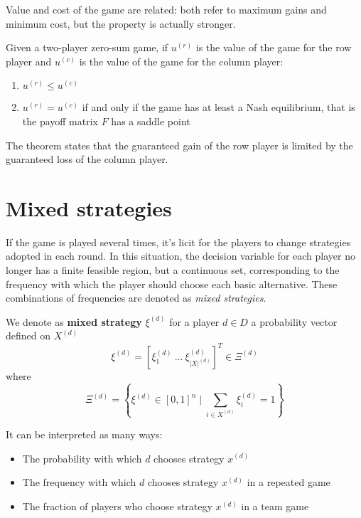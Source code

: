 Value and cost of the game are related: both refer to maximum gains and minimum cost, but the property is actually stronger. \\

\begin{theo}
	Given a two-player zero-sum game, if $u^{(r)}$ is the value of the game for the row player and $u^{(c)}$ is the value of the game for the column player:
	\begin{enumerate}
		\item $u^{(r)} \leq u^{(c)}$
		
		\item $u^{(r)} = u^{(c)}$ if and only if the game has at least a Nash equilibrium, that is the payoff matrix $F$ has a saddle point
	\end{enumerate}
\end{theo}

The theorem states that the guaranteed gain of the row player is limited by the guaranteed loss of the column player.

\section{Mixed strategies}
\label{sec:mixedstrats}

If the game is played several times, it's licit for the players to change strategies adopted in each round. In this situation, the decision variable for each player no longer has a finite feasible region, but a continuous set, corresponding to the frequency with which the player should choose each basic alternative. These combinations of frequencies are denoted as \textit{mixed strategies}. \\

\begin{definition}
	We denote as \textbf{mixed strategy} $\xi^{(d)}$ for a player $d \in D$ a probability vector defined on $X^{(d)}$ 
	$$ \xi^{(d)} = \left[\xi^{(d)}_1 \ \dots \ \xi^{(d)}_{|X|^{(d)}}\right]^T \in \Xi^{(d)} $$
	where 
	$$ \Xi^{(d)} = \left\{\xi^{(d)} \in [0,1]^n \mid \sum_{i \in X^{(d)}} \xi^{(d)}_i = 1 \right\} $$
\end{definition}

It can be interpreted as many ways: 
\begin{itemize}
	\item The probability with which $d$ chooses strategy $x^{(d)}$
	
	\item The frequency with which $d$ chooses strategy $x^{(d)}$ in a repeated game 
	
	\item The fraction of players who choose strategy $x^{(d)}$ in a team game
\end{itemize}

